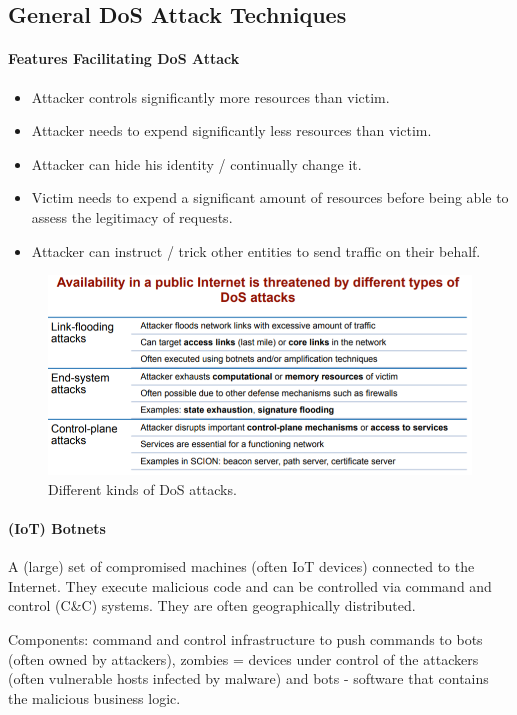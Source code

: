 \subsection{General DoS Attack Techniques}

\paragraph{Features Facilitating DoS Attack}
\begin{itemize}
    \item Attacker controls significantly more resources than victim.
    \item Attacker needs to expend significantly less resources than victim.
    \item Attacker can hide his identity / continually change it.
    \item Victim needs to expend a significant amount of resources before being able to assess the legitimacy of requests.
    \item Attacker can instruct / trick other entities to send traffic on their behalf.
\end{itemize}

\begin{figure}[h]
	\centering
	\includegraphics[scale=0.6]{images/910-attacks.PNG}
	\caption{Different kinds of DoS attacks.}
	\label{fig:attacks}
\end{figure}

\paragraph{(IoT) Botnets}
A (large) set of compromised machines (often IoT devices) connected to the Internet. They execute malicious code and can be controlled via command and control (C\&C) systems. They are often geographically distributed.

Components: command and control infrastructure to push commands to bots (often owned by attackers), zombies = devices under control of the attackers (often vulnerable hosts infected by malware) and bots - software that contains the malicious business logic.

